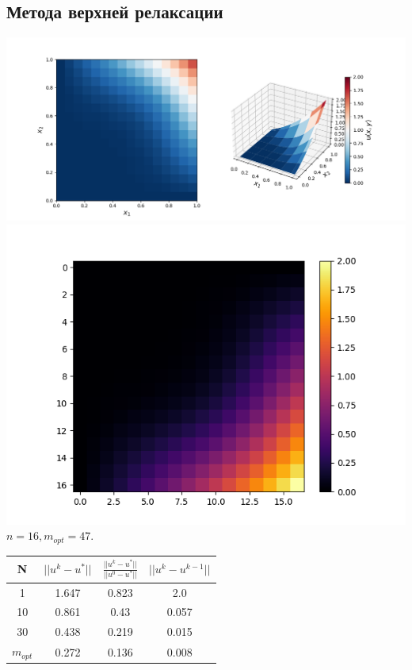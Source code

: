 \documentclass[a4paper, 12pt]{article}
\begin{document}
	\newpage
	\subsection{Метода верхней релаксации}
	
	\begin{center}
		\includegraphics[scale=0.5]{plot33_1.png} \\
		\includegraphics[scale=0.4]{plot33_2.png} \\
		 $n = 16, m_{opt} = 47$.
	\end{center}
	
	\begin{center}
		\begin{tabular}{||c c c c||} 
			\hline
			N & $||u^k-u^*||$ & $\frac{||u^k-u^*||}{||u^0-u^*||}$ & $||u^k-u^{k-1}||$ \\ [0.5ex] 
			\hline\hline
			1 & 1.647 & 0.823 & 2.0 \\ 
			\hline
			10 & 0.861 & 0.43 & 0.057 \\
			\hline
			30 & 0.438 & 0.219 & 0.015 \\
			\hline
			$m_{opt}$ & 0.272 & 0.136 & 0.008 \\ [1ex] 
			\hline
		\end{tabular}
	\end{center}
\end{document}
